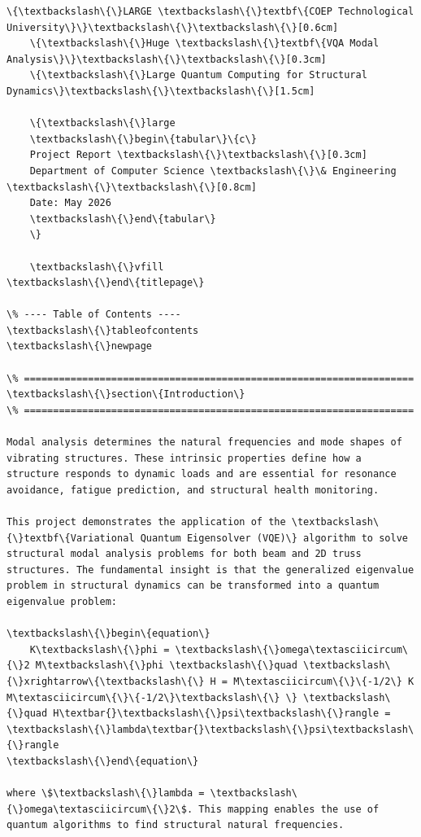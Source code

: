 \documentclass[12pt, a4paper]{article}
\begin{document}
\begin{lstlisting}[style=codestyle, caption={VQA\_Modal\_Analysis\_Report.tex}]
    \{\textbackslash\{\}LARGE \textbackslash\{\}textbf\{COEP Technological University\}\}\textbackslash\{\}\textbackslash\{\}[0.6cm]
    \{\textbackslash\{\}Huge \textbackslash\{\}textbf\{VQA Modal Analysis\}\}\textbackslash\{\}\textbackslash\{\}[0.3cm]
    \{\textbackslash\{\}Large Quantum Computing for Structural Dynamics\}\textbackslash\{\}\textbackslash\{\}[1.5cm]

    \{\textbackslash\{\}large
    \textbackslash\{\}begin\{tabular\}\{c\}
    Project Report \textbackslash\{\}\textbackslash\{\}[0.3cm]
    Department of Computer Science \textbackslash\{\}\& Engineering \textbackslash\{\}\textbackslash\{\}[0.8cm]
    Date: May 2026
    \textbackslash\{\}end\{tabular\}
    \}

    \textbackslash\{\}vfill
\textbackslash\{\}end\{titlepage\}

\% ---- Table of Contents ----
\textbackslash\{\}tableofcontents
\textbackslash\{\}newpage

\% ===================================================================
\textbackslash\{\}section\{Introduction\}
\% ===================================================================

Modal analysis determines the natural frequencies and mode shapes of vibrating structures. These intrinsic properties define how a structure responds to dynamic loads and are essential for resonance avoidance, fatigue prediction, and structural health monitoring.

This project demonstrates the application of the \textbackslash\{\}textbf\{Variational Quantum Eigensolver (VQE)\} algorithm to solve structural modal analysis problems for both beam and 2D truss structures. The fundamental insight is that the generalized eigenvalue problem in structural dynamics can be transformed into a quantum eigenvalue problem:

\textbackslash\{\}begin\{equation\}
    K\textbackslash\{\}phi = \textbackslash\{\}omega\textasciicircum\{\}2 M\textbackslash\{\}phi \textbackslash\{\}quad \textbackslash\{\}xrightarrow\{\textbackslash\{\} H = M\textasciicircum\{\}\{-1/2\} K M\textasciicircum\{\}\{-1/2\}\textbackslash\{\} \} \textbackslash\{\}quad H\textbar{}\textbackslash\{\}psi\textbackslash\{\}rangle = \textbackslash\{\}lambda\textbar{}\textbackslash\{\}psi\textbackslash\{\}rangle
\textbackslash\{\}end\{equation\}

where \$\textbackslash\{\}lambda = \textbackslash\{\}omega\textasciicircum\{\}2\$. This mapping enables the use of quantum algorithms to find structural natural frequencies.


\end{lstlisting}
\end{document}
